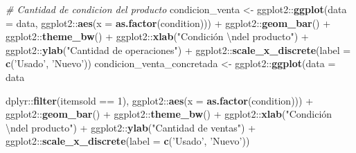 \documentclass[
  12pt]{article}
\newenvironment{Shaded}{}{}
\newcommand{\CharTok}[1]{\textcolor[rgb]{0.25,0.44,0.63}{#1}}
\newcommand{\CommentTok}[1]{\textcolor[rgb]{0.38,0.63,0.69}{\textit{#1}}}
\newcommand{\DataTypeTok}[1]{\textcolor[rgb]{0.56,0.13,0.00}{#1}}
\newcommand{\DecValTok}[1]{\textcolor[rgb]{0.25,0.63,0.44}{#1}}
\newcommand{\KeywordTok}[1]{\textcolor[rgb]{0.00,0.44,0.13}{\textbf{#1}}}
\newcommand{\NormalTok}[1]{#1}
\newcommand{\OperatorTok}[1]{\textcolor[rgb]{0.40,0.40,0.40}{#1}}
\newcommand{\StringTok}[1]{\textcolor[rgb]{0.25,0.44,0.63}{#1}}
\begin{document}
\begin{Shaded}
\begin{Highlighting}[]
{{{{\CommentTok{# Cantidad de condicion del producto}
\NormalTok{condicion_venta <-}\StringTok{ }\NormalTok{ggplot2}\OperatorTok{::}\KeywordTok{ggplot}\NormalTok{(}\DataTypeTok{data =}\NormalTok{ data, ggplot2}\OperatorTok{::}\KeywordTok{aes}\NormalTok{(}\DataTypeTok{x =} \KeywordTok{as.factor}\NormalTok{(condition))) }\OperatorTok{+}
\StringTok{  }\NormalTok{ggplot2}\OperatorTok{::}\KeywordTok{geom_bar}\NormalTok{() }\OperatorTok{+}
\StringTok{  }\NormalTok{ggplot2}\OperatorTok{::}\KeywordTok{theme_bw}\NormalTok{() }\OperatorTok{+}
\StringTok{  }\NormalTok{ggplot2}\OperatorTok{::}\KeywordTok{xlab}\NormalTok{(}\StringTok{"Condición }\CharTok{\textbackslash{}n}\StringTok{del producto"}\NormalTok{) }\OperatorTok{+}\StringTok{ }\NormalTok{ggplot2}\OperatorTok{::}\KeywordTok{ylab}\NormalTok{(}\StringTok{"Cantidad de operaciones"}\NormalTok{) }\OperatorTok{+}
\StringTok{  }\NormalTok{ggplot2}\OperatorTok{::}\KeywordTok{scale_x_discrete}\NormalTok{(}\DataTypeTok{label =} \KeywordTok{c}\NormalTok{(}\StringTok{'Usado'}\NormalTok{, }\StringTok{'Nuevo'}\NormalTok{))}
\NormalTok{condicion_venta_concretada <-}\StringTok{ }\NormalTok{ggplot2}\OperatorTok{::}\KeywordTok{ggplot}\NormalTok{(}\DataTypeTok{data =}\NormalTok{ data }\OperatorTok{%>%}
\StringTok{                                                }\NormalTok{dplyr}\OperatorTok{::}\KeywordTok{filter}\NormalTok{(itemsold }\OperatorTok{==}\StringTok{ }\DecValTok{1}\NormalTok{), }
\NormalTok{                                              ggplot2}\OperatorTok{::}\KeywordTok{aes}\NormalTok{(}\DataTypeTok{x =} \KeywordTok{as.factor}\NormalTok{(condition))) }\OperatorTok{+}
\StringTok{  }\NormalTok{ggplot2}\OperatorTok{::}\KeywordTok{geom_bar}\NormalTok{() }\OperatorTok{+}
\StringTok{  }\NormalTok{ggplot2}\OperatorTok{::}\KeywordTok{theme_bw}\NormalTok{() }\OperatorTok{+}
\StringTok{  }\NormalTok{ggplot2}\OperatorTok{::}\KeywordTok{xlab}\NormalTok{(}\StringTok{"Condición }\CharTok{\textbackslash{}n}\StringTok{del producto"}\NormalTok{) }\OperatorTok{+}\StringTok{ }\NormalTok{ggplot2}\OperatorTok{::}\KeywordTok{ylab}\NormalTok{(}\StringTok{"Cantidad de ventas"}\NormalTok{) }\OperatorTok{+}
\StringTok{  }\NormalTok{ggplot2}\OperatorTok{::}\KeywordTok{scale_x_discrete}\NormalTok{(}\DataTypeTok{label =} \KeywordTok{c}\NormalTok{(}\StringTok{'Usado'}\NormalTok{, }\StringTok{'Nuevo'}\NormalTok{))}

}}}}}
\end{Highlighting}
\end{Shaded}
\end{document}
